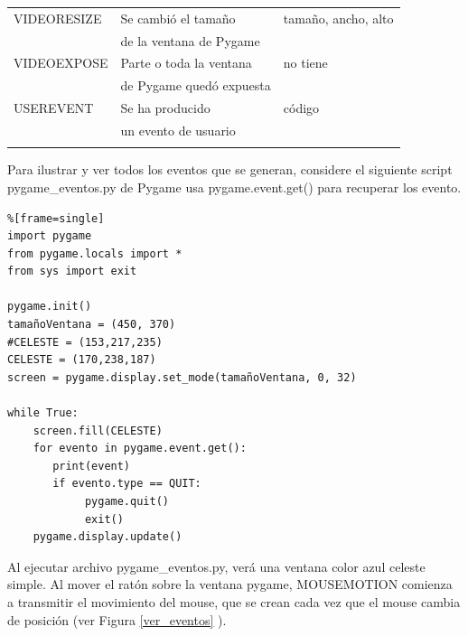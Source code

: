 \begin{center}
{{{\begin{tabular}{l l l }
					VIDEORESIZE     & Se cambió el tamaño     & tamaño, ancho, alto \\
					&  de la ventana de Pygame &   \\
					VIDEOEXPOSE     &  Parte o toda la ventana  & no tiene\\ 
					& de Pygame quedó expuesta &   \\
					USEREVENT       & Se ha producido  &   código \\ 
					& un evento de usuario& \\			                  
					\arrayrulecolor{vino}\hline 
					\label{tipo_evento}   
				\end{tabular}		
	}}} 
\end{center}


Para ilustrar y ver todos los eventos que se generan, considere el siguiente {\ttfamily script  pygame\_eventos.py} de Pygame
usa {\ttfamily pygame.event.get()} para recuperar los evento. 


\hspace{-2.4cm}{\ttfamily \scriptsize pygame\_}

\vspace{-0.2cm}
\hspace{-2.4cm}{\ttfamily \scriptsize eventos.py}\vspace{-0.84cm}
\begin{lstlisting}%[frame=single]
import pygame
from pygame.locals import *
from sys import exit

pygame.init()
tamañoVentana = (450, 370)
#CELESTE = (153,217,235)
CELESTE = (170,238,187)
screen = pygame.display.set_mode(tamañoVentana, 0, 32)

while True:
    screen.fill(CELESTE)
    for evento in pygame.event.get():
       print(event)
       if evento.type == QUIT:
            pygame.quit()
            exit()
    pygame.display.update()
\end{lstlisting}

Al  ejecutar archivo {\ttfamily pygame\_eventos.py}, verá una ventana color azul celeste simple. Al mover el ratón sobre la ventana pygame,  {\ttfamily MOUSEMOTION} comienza a transmitir el movimiento del mouse, que se crean cada vez que el mouse cambia de posición
(ver Figura \ref{ver_eventos} ). 

